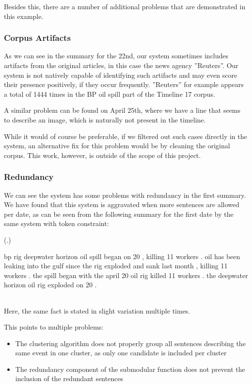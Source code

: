 \documentclass[a4paper,BCOR=10mm]{report}
\newcounter{quotecount}[chapter]
\newcommand{\countquotenosource}[1]{\vspace{1cm}\refstepcounter{quotecount}%
     (\thechapter.\arabic{quotecount}) \hspace*{1cm} \parbox{9cm}{#1}\\[1cm]}
\numberwithin{lemma}{chapter}
\numberwithin{definition}{chapter}
\begin{document}
Besides this, there are a number of additional problems that are demonstrated in this example.

\subsubsection{Corpus Artifacts}

As we can see in the summary for the 22nd, our system sometimes includes artifacts from the original articles, in this case the news agency ''Reuters''. Our system is not natively capable of identifying such artifacts and may even score their presence positively, if they occur frequently.
''Reuters'' for example appears a total of 1444 times in the BP oil spill part of the Timeline 17 corpus.

A similar problem can be found on April 25th, where we have a line that seems to describe an image, which is naturally not present in the timeline.

While it would of course be preferable, if we filtered out such cases directly in the system, an alternative fix for this problem would be by cleaning the original corpus. This work, however, is outside of the scope of this project.

\subsubsection{Redundancy}

We can see the system has some problems with redundancy in the first summary. We have found that this system is aggravated when more sentences are allowed per date, as can be seen from the following summary for the first date by the same system with token constraint:

\countquotenosource{
bp rig deepwater horizon oil spill began on 20 , killing 11 workers .
oil has been leaking into the gulf since the rig exploded and sank last month , killing 11 workers .
the spill began with the april 20 oil rig killed 11 workers .
the deepwater horizon oil rig exploded on 20 .
\label{ex:redundancy}
}

Here, the same fact is stated in slight variation multiple times.

This points to multiple problems:

\begin{itemize}
    \item{The clustering algorithm does not properly group all sentences describing the same event in one cluster, as only one candidate is included per cluster }
    \item{The redundancy component of the submodular function does not prevent the inclusion of the redundant sentences }
\end{itemize}
\end{document}
